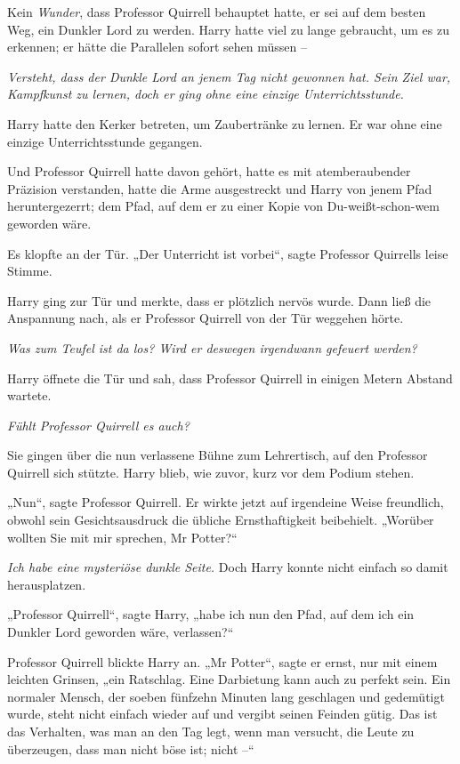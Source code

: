 {Kein \emph{Wunder}, dass Professor Quirrell behauptet hatte, er sei auf dem besten Weg, ein Dunkler Lord zu werden. Harry hatte viel zu lange gebraucht, um es zu erkennen; er hätte die Parallelen sofort sehen müssen --

\emph{Versteht, dass der Dunkle Lord an jenem Tag nicht gewonnen hat. Sein Ziel war, Kampfkunst zu lernen, doch er ging ohne eine einzige Unterrichtsstunde.}

Harry hatte den Kerker betreten, um Zaubertränke zu lernen. Er war ohne eine einzige Unterrichtsstunde gegangen.

Und Professor Quirrell hatte davon gehört, hatte es mit atemberaubender Präzision verstanden, hatte die Arme ausgestreckt und Harry von jenem Pfad heruntergezerrt; dem Pfad, auf dem er zu einer Kopie von Du-weißt-schon-wem geworden wäre.

Es klopfte an der Tür. „Der Unterricht ist vorbei“, sagte Professor Quirrells leise Stimme.

Harry ging zur Tür und merkte, dass er plötzlich nervös wurde. Dann ließ die Anspannung nach, als er Professor Quirrell von der Tür weggehen hörte.

\emph{Was zum Teufel ist da los? Wird er deswegen irgendwann gefeuert werden?}

Harry öffnete die Tür und sah, dass Professor Quirrell in einigen Metern Abstand wartete.

\emph{Fühlt Professor Quirrell es auch?}

Sie gingen über die nun verlassene Bühne zum Lehrertisch, auf den Professor Quirrell sich stützte. Harry blieb, wie zuvor, kurz vor dem Podium stehen.

„Nun“, sagte Professor Quirrell. Er wirkte jetzt auf irgendeine Weise freundlich, obwohl sein Gesichtsausdruck die übliche Ernsthaftigkeit beibehielt. „Worüber wollten Sie mit mir sprechen, Mr Potter?“

\emph{Ich habe eine mysteriöse dunkle Seite.} Doch Harry konnte nicht einfach so damit herausplatzen.

„Professor Quirrell“, sagte Harry, „habe ich nun den Pfad, auf dem ich ein Dunkler Lord geworden wäre, verlassen?“

Professor Quirrell blickte Harry an. „Mr Potter“, sagte er ernst, nur mit einem leichten Grinsen, „ein Ratschlag. Eine Darbietung kann auch zu perfekt sein. Ein normaler Mensch, der soeben fünfzehn Minuten lang geschlagen und gedemütigt wurde, steht nicht einfach wieder auf und vergibt seinen Feinden gütig. Das ist das Verhalten, was man an den Tag legt, wenn man versucht, die Leute zu überzeugen, dass man nicht böse ist; nicht --“

}
